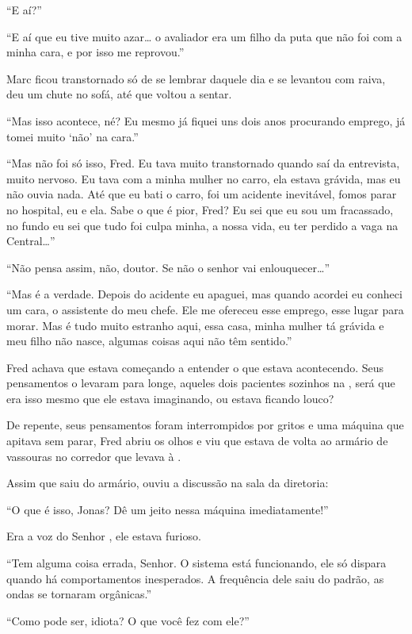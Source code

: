 ``E aí?''

``E aí que eu tive muito azar\ldots{} o avaliador era um filho da puta que
não foi com a minha cara, e por isso me reprovou.''

Marc ficou transtornado só de se lembrar daquele dia e se levantou com
raiva, deu um chute no sofá, até que voltou a sentar.

``Mas isso acontece, né? Eu mesmo já fiquei uns dois anos procurando
emprego, já tomei muito `não' na cara.''

``Mas não foi só isso, Fred. Eu tava muito transtornado quando saí da
entrevista, muito nervoso. Eu tava com a minha mulher no carro, ela
estava grávida, mas eu não ouvia nada. Até que eu bati o carro, foi um
acidente inevitável, fomos parar no hospital, eu e ela. Sabe o que é
pior, Fred? Eu sei que eu sou um fracassado, no fundo eu sei que tudo
foi culpa minha, a nossa vida, eu ter perdido a vaga na Central\ldots{}''

``Não pensa assim, não, doutor. Se não o senhor vai
enlouquecer\ldots{}''

``Mas é a verdade. Depois do acidente eu apaguei, mas quando acordei eu
conheci um cara, o assistente do meu chefe. Ele me ofereceu esse
emprego, esse lugar para morar. Mas é tudo muito estranho aqui, essa
casa, minha mulher tá grávida e meu filho não nasce, algumas coisas aqui
não têm sentido.''

Fred achava que estava começando a entender o que estava acontecendo.
Seus pensamentos o levaram para longe, aqueles dois pacientes sozinhos
na , será que era isso mesmo que ele estava imaginando, ou estava
ficando louco?

De repente, seus pensamentos foram interrompidos por gritos e uma
máquina que apitava sem parar, Fred abriu os olhos e viu que estava de
volta ao armário de vassouras no corredor que levava à .

Assim que saiu do armário, ouviu a discussão na sala da diretoria:

``O que é isso, Jonas? Dê um jeito nessa máquina imediatamente!''

Era a voz do Senhor , ele estava furioso.

``Tem alguma coisa errada, Senhor. O sistema está funcionando, ele só
dispara quando há comportamentos inesperados. A frequência dele saiu do
padrão, as ondas se tornaram orgânicas.''

``Como pode ser, idiota? O que você fez com ele?''

